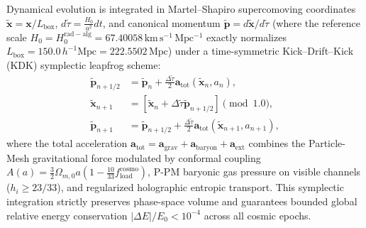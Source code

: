 \documentclass[11pt]{article}
\theoremstyle{plain}
\begin{document}
Dynamical evolution is integrated in Martel--Shapiro supercomoving coordinates $\tilde{\mathbf{x}} = \mathbf{x} / L_{\mathrm{box}}$, $d\tilde{\tau} = \frac{H_0}{a^2} dt$, and canonical momentum $\tilde{\mathbf{p}} = d\tilde{\mathbf{x}} / d\tilde{\tau}$ (where the reference scale $H_0 = H_0^{\mathrm{rad-alg}} = 67.40058\,\mathrm{km\,s^{-1}\,Mpc^{-1}}$ exactly normalizes $L_{\mathrm{box}} = 150.0\,h^{-1}\mathrm{Mpc} = 222.5502\,\mathrm{Mpc}$) under a time-symmetric Kick--Drift--Kick (KDK) symplectic leapfrog scheme:
\begin{align}
    \tilde{\mathbf{p}}_{n+1/2} &= \tilde{\mathbf{p}}_n + \frac{\Delta \tilde{\tau}}{2} \mathbf{a}_{\mathrm{tot}}(\tilde{\mathbf{x}}_n, a_n), \\
    \tilde{\mathbf{x}}_{n+1} &= \left[ \tilde{\mathbf{x}}_n + \Delta \tilde{\tau} \tilde{\mathbf{p}}_{n+1/2} \right] \pmod{1.0}, \\
    \tilde{\mathbf{p}}_{n+1} &= \tilde{\mathbf{p}}_{n+1/2} + \frac{\Delta \tilde{\tau}}{2} \mathbf{a}_{\mathrm{tot}}(\tilde{\mathbf{x}}_{n+1}, a_{n+1}),
\end{align}
where the total acceleration $\mathbf{a}_{\mathrm{tot}} = \mathbf{a}_{\mathrm{grav}} + \mathbf{a}_{\mathrm{baryon}} + \mathbf{a}_{\mathrm{ext}}$ combines the Particle-Mesh gravitational force modulated by conformal coupling $A(a) = \frac{3}{2}\Omega_{m,0} a (1 - \frac{10}{33}f_{\mathrm{load}}^{\mathrm{cosmo}})$, P-PM baryonic gas pressure on visible channels ($h_i \ge 23/33$), and regularized holographic entropic transport. This symplectic integration strictly preserves phase-space volume and guarantees bounded global relative energy conservation $|\Delta E| / E_0 < 10^{-4}$ across all cosmic epochs.
\end{document}
